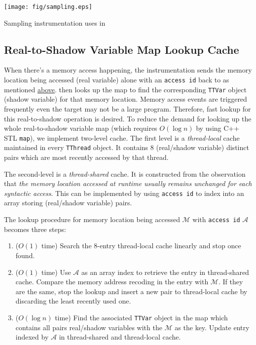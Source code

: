 \begin{center-figure}
	\texttt{[image: fig/sampling.eps]}
	\caption{Sampling instrumentation uses in \ThreadTracer{}}
	\label{fig:ThreadTracer_sampling}
\end{center-figure}

\subsection{Real-to-Shadow Variable Map Lookup Cache}
\label{ss:real-to-shadow-lookup}
When there's a memory access happening, the instrumentation sends the memory location being accessed (real variable) alone with an \verb|access id| back to \ThreadTracer{} as mentioned \hyperref[a:var-access-instrumentation]{above}. \ThreadTracer{} then looks up the map to find the corresponding \verb|TTVar| object (shadow variable) for that memory location. Memory access events are triggered frequently even the target may not be a large program. Therefore, fast lookup for this real-to-shadow operation is desired. To reduce the demand for looking up the whole real-to-shadow variable map (which requires $O(\log n)$ by using C++ STL \verb|map|), we implement two-level cache. The first level is a \textit{thread-local} cache maintained in every \verb|TThread| object. It contains 8 (real/shadow variable) distinct pairs which are most recently accessed by that thread.

The second-level is a \textit{thread-shared} cache. It is constructed from the observation that \textit{the memory location accessed at runtime usually remains unchanged for each syntactic access}. This can be implemented by using \verb|access id| to index into an array storing (real/shadow variable) pairs.

The lookup procedure for memory location being accessed $\mathcal{M}$ with \verb|access id| $\mathcal{A}$ becomes three steps:
\begin{enumerate}
	\item ($O(1)$ time) Search the 8-entry thread-local cache linearly and stop once found.
	\item ($O(1)$ time) Use $\mathcal{A}$ as an array index to retrieve the entry in thread-shared cache. Compare the memory address recoding in the entry with $\mathcal{M}$. If they are the same, stop the lookup and insert a new pair to thread-local cache by discarding the least recently used one.
	\item \label{lbl:real-to-shadow-lookup-step3}($O(\log n)$ time) Find the associated \verb|TTVar| object in the map which contains all pairs real/shadow variables with the $\mathcal{M}$ as the key. Update entry indexed by $\mathcal{A}$ in thread-shared and thread-local cache.
\end{enumerate}

